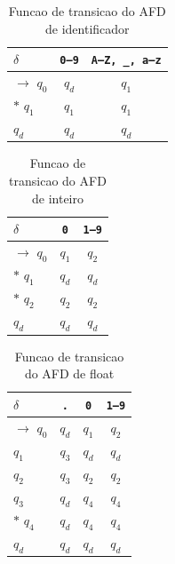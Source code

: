 
\begin{table}[htb]
\centering
\caption{Funcao de transicao do AFD de identificador}
\label{tab:afd-identificador}
\begin{tabular}{l|cc}
\hline
$\delta$ & \texttt{0--9} & \texttt{A--Z, \_, a--z} \\
\hline
$\rightarrow$ $q_{0}$ & $q_{d}$ & $q_{1}$ \\
$*$ $q_{1}$ & $q_{1}$ & $q_{1}$ \\
$q_{d}$ & $q_{d}$ & $q_{d}$ \\
\hline
\end{tabular}
\end{table}

\begin{table}[htb]
\centering
\caption{Funcao de transicao do AFD de inteiro}
\label{tab:afd-inteiro}
\begin{tabular}{l|cc}
\hline
$\delta$ & \texttt{0} & \texttt{1--9} \\
\hline
$\rightarrow$ $q_{0}$ & $q_{1}$ & $q_{2}$ \\
$*$ $q_{1}$ & $q_{d}$ & $q_{d}$ \\
$*$ $q_{2}$ & $q_{2}$ & $q_{2}$ \\
$q_{d}$ & $q_{d}$ & $q_{d}$ \\
\hline
\end{tabular}
\end{table}

\begin{table}[htb]
\centering
\caption{Funcao de transicao do AFD de float}
\label{tab:afd-float}
\begin{tabular}{l|ccc}
\hline
$\delta$ & \texttt{.} & \texttt{0} & \texttt{1--9} \\
\hline
$\rightarrow$ $q_{0}$ & $q_{d}$ & $q_{1}$ & $q_{2}$ \\
$q_{1}$ & $q_{3}$ & $q_{d}$ & $q_{d}$ \\
$q_{2}$ & $q_{3}$ & $q_{2}$ & $q_{2}$ \\
$q_{3}$ & $q_{d}$ & $q_{4}$ & $q_{4}$ \\
$*$ $q_{4}$ & $q_{d}$ & $q_{4}$ & $q_{4}$ \\
$q_{d}$ & $q_{d}$ & $q_{d}$ & $q_{d}$ \\
\hline
\end{tabular}
\end{table}

